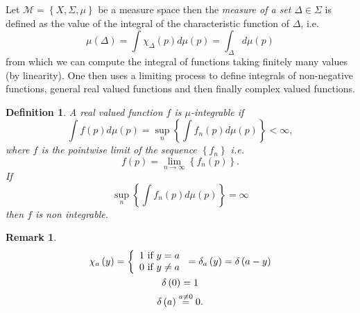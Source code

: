 \documentclass[aps,preprint]{revtex4}%
\providecommand{\U}[1]{\protect\rule{.1in}{.1in}}
\newtheorem{definition}[theorem]{Definition}
\newtheorem{remark}[theorem]{Remark}
\begin{document}
Let $\mathcal{M}=\left\{  X,\Sigma,%
\mu
\right\}  $ be a measure space then the \emph{measure of a set} $\Delta
\in\Sigma$ is defined as the value of the integral of the characteristic
function of $\Delta$, i.e.
\begin{equation}%
\mu
\left(  \Delta\right)  =\int\chi_{\Delta}\left(  p\right)  d%
\mu
\left(  p\right)  =\int_{\Delta}d%
\mu
\left(  p\right)
\end{equation}
from which we can compute the integral of functions taking finitely many
values (by linearity). One then uses a limiting process to define integrals of
non-negative functions, general real valued functions and then finally complex
valued functions.

\begin{definition}
A \emph{real valued} function $f$ is $%
\mu
$-integrable if%
\begin{equation}
\int f\left(  p\right)  d%
\mu
\left(  p\right)  =\sup\limits_{n}\left\{  \int f_{n}\left(  p\right)  d%
\mu
\left(  p\right)  \right\}  <\infty,
\end{equation}
where $f$ is the pointwise limit of the sequence $\left\{  f_{n}\right\}  $
i.e.
\begin{equation}
f\left(  p\right)  =\lim\limits_{n\rightarrow\infty}\left\{  f_{n}\left(
p\right)  \right\}  .
\end{equation}
If
\begin{equation}
\sup\limits_{n}\left\{  \int f_{n}\left(  p\right)  d%
\mu
\left(  p\right)  \right\}  =\infty
\end{equation}
then $f$ is non integrable.
\end{definition}

\begin{remark}%
\begin{gather}
\chi_{a}\left(  y\right)  =\left\{
\begin{array}
[c]{c}%
1\text{ if }y=a\\
0\text{ if }y\neq a
\end{array}
\right.  =\delta_{a}\left(  y\right)  =\delta\left(  a-y\right) \\
\delta\left(  0\right)  =1\\
\delta\left(  a\right)  \overset{a\neq0}{=}0.
\end{gather}

\end{remark}
\end{document}
